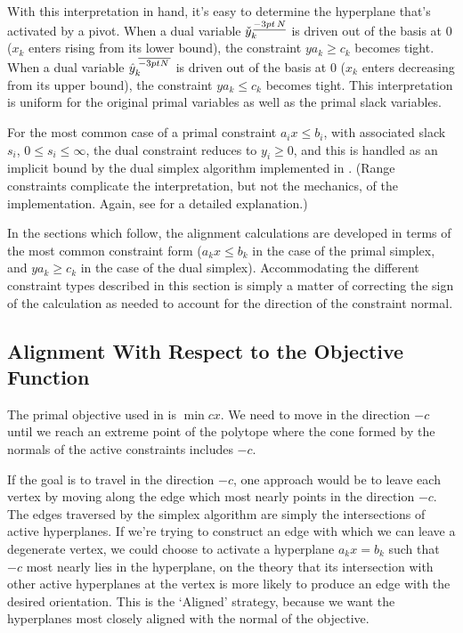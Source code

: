 With this interpretation in hand, it's easy to determine the hyperplane that's
activated by a pivot.
When a dual variable $\check{y}^{\nblb}_k$ is driven out of the basis at 0
($x_k$ enters rising from its lower bound),
the constraint $y a_k \geq c_k$ becomes tight.
When a dual variable $\hat{y}^{\nbub}_k$ is driven out of the basis at 0
($x_k$ enters decreasing from its upper bound),
the constraint $y a_k \leq c_k$ becomes tight.
This interpretation is uniform for the original primal variables as well as
the primal slack variables.

For the most common case of a primal constraint $a_i x \leq b_i$, with
associated slack $s_i$, $0 \leq s_i \leq \infty$, the dual constraint
reduces to $y_i \geq 0$, and this is handled as an implicit bound by the
dual simplex algorithm implemented in \dylp.
(Range constraints complicate the interpretation, but not the mechanics, of
the implementation.
Again, see \cite{Haf98a} for a detailed explanation.)

In the sections which follow, the alignment calculations are developed in
terms of the most common constraint form ($a_k x \leq b_k$ in the case of
the primal simplex, and $y a_k \geq c_k$ in the case of the dual simplex).
Accommodating the different constraint types described in this section is
simply a matter of correcting the sign of the calculation as needed to account
for the direction of the constraint normal.


\subsection{Alignment With Respect to the Objective Function}

The primal objective used in \dylp is $\min cx$.
We need to move in the direction $-c$ until
we reach an extreme point of the polytope where the cone formed by the normals
of the active constraints includes $-c$.

If the goal is to travel in the direction $-c$, one approach would be to
leave each vertex by moving along the edge which most nearly points in the
direction $-c$.
The edges traversed by the simplex algorithm are simply the intersections of
active hyperplanes.
If we're trying to construct an edge with which we can leave a degenerate
vertex, we could choose to activate a hyperplane $a_k x = b_k$ such that
$-c$ most nearly lies in the hyperplane, on the
theory that its intersection with other active hyperplanes at the vertex is
more likely to produce an edge with the desired orientation.
This is the `Aligned' strategy, because we want the hyperplanes most closely
aligned with the normal of the objective.

